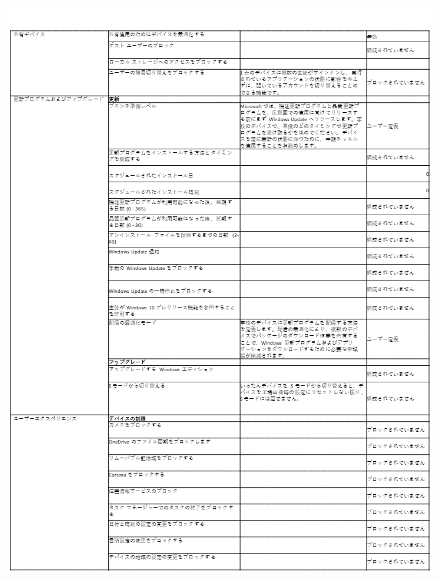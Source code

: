 \begin{figure}[htbp]
    \centering
    \vspace{-1.0cm}
    \includegraphics[width=17cm]{figures/IntuneforEducation-04.png}
\end{figure}

